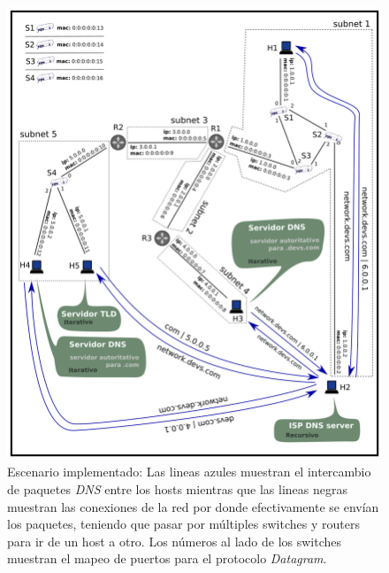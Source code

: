 \documentclass[10pt,a4paper]{article}
\begin{document}
\begin{figure}[!htb]
    \centering
    \includegraphics[width = 1.0\textwidth]{img/png/scenario.png}
    \caption{Escenario implementado: Las lineas azules muestran el intercambio de paquetes \textit{DNS} entre los hosts mientras que las lineas negras muestran las conexiones de la red por donde efectivamente se envían los paquetes, teniendo que pasar por múltiples switches y routers para ir de un host a otro. Los números al lado de los switches muestran el mapeo de puertos para el protocolo \textit{Datagram}.}
    \label{figure: case study}
\end{figure}

\newpage
\end{document}
